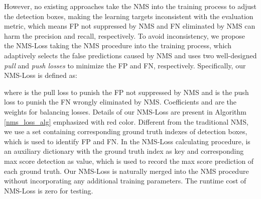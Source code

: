 \documentclass[sigconf]{acmart}
\begin{document}
However, no existing approaches take the NMS into the training process to adjust the detection boxes, making the learning targets inconsistent with the evaluation metric, which means FP not suppressed by NMS and FN eliminated by NMS can harm the precision and recall, respectively. To avoid inconsistency, we propose the NMS-Loss taking the NMS procedure into the training process, which adaptively selects the false predictions caused by NMS and uses two well-designed \emph{pull} and \emph{push losses} to minimize the FP and FN, respectively. Specifically, our NMS-Loss is defined as:


where  is the pull loss to punish the FP not suppressed by NMS and  is the push loss to punish the FN wrongly eliminated by NMS. Coefficients  and  are the weights for balancing losses. Details of our NMS-Loss are present in Algorithm \ref{nms_loss_alg} emphasized with red color. Different from the traditional NMS, we use a set  containing corresponding ground truth indexes of detection boxes, which is used to identify FP and FN. In the NMS-Loss calculating procedure,  is an auxiliary dictionary with the ground truth index as key and corresponding max score detection as value, which is used to record the max score prediction of each ground truth. Our NMS-Loss is naturally merged into the NMS procedure without incorporating any additional training parameters. The runtime cost of NMS-Loss is zero for testing.
\end{document}
